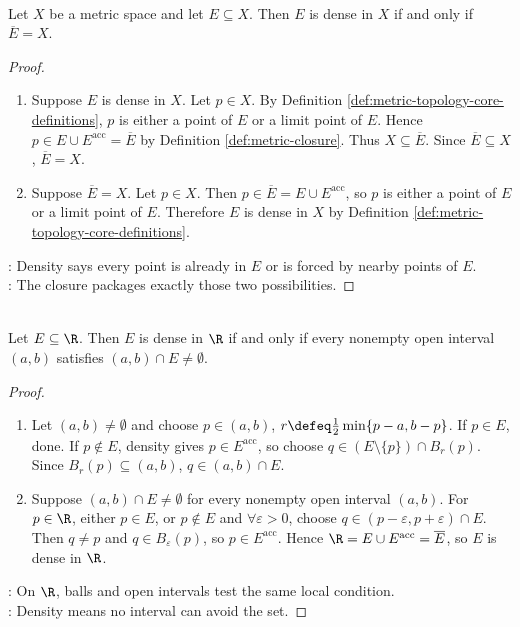 \begin{proposition} \label{prop:dense-closure-criterion} \\
Let $X$ be a metric space and let $E\subseteq X$. Then $E$ is dense in $X$ if and only if $\overline{E}=X$.
\begin{proof}
\begin{enumerate}[label=\roman*.]
\setlength{\itemsep}{0pt}
\item[$(\Rightarrow)$] Suppose $E$ is dense in $X$. Let $p\in X$. By Definition \ref{def:metric-topology-core-definitions}, $p$ is either a point of $E$ or a limit point of $E$. Hence $p\in E\cup E^{\operatorname{acc}}=\overline{E}$ by Definition \ref{def:metric-closure}. Thus $X\subseteq\overline{E}$. Since $\overline{E}\subseteq X$, $\overline{E}=X$.
\item[$(\Leftarrow)$] Suppose $\overline{E}=X$. Let $p\in X$. Then $p\in\overline{E}=E\cup E^{\operatorname{acc}}$, so $p$ is either a point of $E$ or a limit point of $E$. Therefore $E$ is dense in $X$ by Definition \ref{def:metric-topology-core-definitions}.
\end{enumerate}
: Density says every point is already in $E$ or is forced by nearby points of $E$.\\
: The closure packages exactly those two possibilities.
\end{proof}
\end{proposition}

\begin{proposition} \label{prop:dense-closure-and-interval-test} \\
Let $E\subseteq\R$. Then $E$ is dense in $\R$ if and only if every nonempty open interval $(a,b)$ satisfies $(a,b)\cap E\neq\emptyset$.
\begin{proof}
\begin{enumerate}[label=\roman*.]
\setlength{\itemsep}{0pt}
\item[$(\Rightarrow)$] Let $(a,b)\ne\emptyset$ and choose $p\in(a,b)$, $r\defeq\frac12\min\{p-a,b-p\}$. If $p\in E$, done. If $p\notin E$, density gives $p\in E^{\operatorname{acc}}$, so choose $q\in(E\setminus\{p\})\cap B_r(p)$. Since $B_r(p)\subseteq(a,b)$, $q\in(a,b)\cap E$.
\item[$(\Leftarrow)$] Suppose $(a,b)\cap E\ne\emptyset$ for every nonempty open interval $(a,b)$. For $p\in\R$, either $p\in E$, or $p\notin E$ and $\forall\varepsilon>0$, choose $q\in(p-\varepsilon,p+\varepsilon)\cap E$. Then $q\ne p$ and $q\in B_\varepsilon(p)$, so $p\in E^{\operatorname{acc}}$. Hence $\R=E\cup E^{\operatorname{acc}}=\overline{E}$, so $E$ is dense in $\R$.
\end{enumerate}
: On $\R$, balls and open intervals test the same local condition.\\
: Density means no interval can avoid the set.
\end{proof}
\end{proposition}

